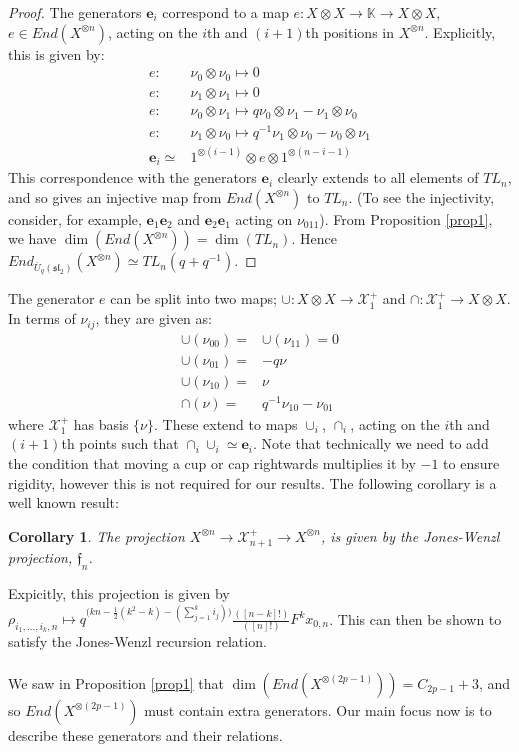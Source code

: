 \documentclass[]{article}
\newtheorem{corr}{Corollary}[prop]
\begin{document}
\begin{proof}
The generators $\mathbf{e}_{i}$ correspond to a map $e:X\otimes X\rightarrow \mathbb{K}\rightarrow X\otimes X$, $e\in End(X^{\otimes n})$, acting on the $i$th and $(i+1)$th positions in $X^{\otimes n}$. Explicitly, this is given by:
\begin{align*}
e:&\nu_{0}\otimes\nu_{0}\mapsto 0\\
e:&\nu_{1}\otimes\nu_{1}\mapsto 0\\
e:&\nu_{0}\otimes\nu_{1}\mapsto q\nu_{0}\otimes\nu_{1}-\nu_{1}\otimes\nu_{0}\\
e:&\nu_{1}\otimes\nu_{0}\mapsto q^{-1}\nu_{1}\otimes\nu_{0}-\nu_{0}\otimes\nu_{1}\\
\mathbf{e}_{i}\simeq& 1^{\otimes (i-1)}\otimes e\otimes 1^{\otimes(n-i-1)}
\end{align*}
This correspondence with the generators $\mathbf{e}_{i}$ clearly extends to all elements of $TL_{n}$, and so gives an injective map from $End(X^{\otimes n})$ to $TL_{n}$. (To see the injectivity, consider, for example, $\mathbf{e}_{1}\mathbf{e}_{2}$ and $\mathbf{e}_{2}\mathbf{e}_{1}$ acting on $\nu_{011}$). From Proposition \ref{prop1}, we have $\dim\left( End(X^{\otimes n})\right)=\dim\left( TL_{n}\right)$. Hence\\ $End_{\bar{U}_{q}(\mathfrak{sl}_{2})}(X^{\otimes n})\simeq TL_{n}(q+q^{-1})$.
\end{proof}
The generator $e$ can be split into two maps; $\cup:X\otimes X\rightarrow\mathcal{X}^{+}_{1}$ and $\cap:\mathcal{X}^{+}_{1}\rightarrow X\otimes X$. In terms of $\nu_{ij}$, they are given as:
\begin{align*}
\cup(\nu_{00})=&\cup(\nu_{11})=0\\
\cup(\nu_{01})=&-q\nu\\
\cup(\nu_{10})=& \nu\\
\cap(\nu)=& q^{-1}\nu_{10}-\nu_{01}
\end{align*}
where $\mathcal{X}^{+}_{1}$ has basis $\{\nu\}$. These extend to maps $\cup_{i}$, $\cap_{i}$, acting on the $i$th and $(i+1)$th points such that $\cap_{i}\cup_{i}\simeq\mathbf{e}_{i}$. Note that technically we need to add the condition that moving a cup or cap rightwards multiplies it by $-1$ to ensure rigidity, however this is not required for our results. The following corollary is a well known result:
\begin{corr}
The projection $X^{\otimes n}\rightarrow \mathcal{X}^{+}_{n+1}\rightarrow X^{\otimes n}$, is given by the Jones-Wenzl projection, $\mathfrak{f}_{n}$.\\
\end{corr}
Expicitly, this projection is given by $\rho_{i_{1},...,i_{k},n}\mapsto q^{\big(kn-\frac{1}{2}(k^{2}-k)-(\sum\limits_{j=1}^{k}i_{j})\big)}\frac{([n-k]!)}{([n]!)}F^{k}x_{0,n}$. This can then be shown to satisfy the Jones-Wenzl recursion relation.\\
\\
We saw in Proposition \ref{prop1} that $\dim\left( End(X^{\otimes (2p-1)})\right)=C_{2p-1}+3$, and so $End(X^{\otimes (2p-1)})$ must contain extra generators. Our main focus now is to describe these generators and their relations.\\
\\
\end{document}
